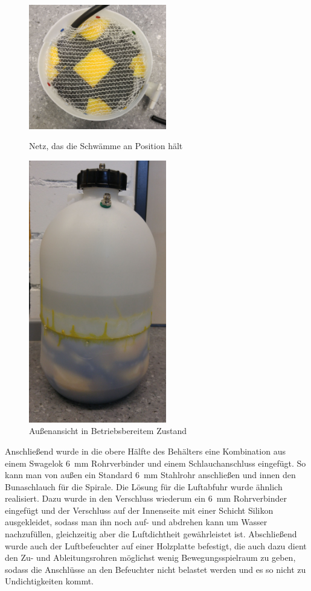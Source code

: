 \begin{figure}[h!]
	\begin{minipage}[hbt]{6cm}
		\centering
		\includegraphics[width=6cm]{Luftbefeuchter_Netz.jpg}
		\caption[Netz Luftbefeuchter]{Netz, das die Schwämme an Position hält}
	\end{minipage}
	\hfill
	\begin{minipage}[hbt]{6cm}
		\centering
		\includegraphics[width=6cm]{Luftbefeuchter_gesamt.jpg}
		\caption[Außenansicht Luftbefeuchter]{Außenansicht in Betriebsbereitem Zustand}
	\end{minipage}
\end{figure}

\vspace{1cm}

Anschließend wurde in die obere Hälfte des Behälters eine Kombination aus einem Swagelok \SI{6}{mm} Rohrverbinder und einem Schlauchanschluss eingefügt. So kann man von außen ein Standard \SI{6}{mm} Stahlrohr anschließen und innen den Bunaschlauch für die Spirale. Die Lösung für die Luftabfuhr wurde ähnlich realisiert. Dazu wurde in den Verschluss wiederum ein \SI{6}{mm} Rohrverbinder eingefügt und der Verschluss auf der Innenseite mit einer Schicht Silikon ausgekleidet, sodass man ihn noch auf- und abdrehen kann um Wasser nachzufüllen, gleichzeitig aber die Luftdichtheit gewährleistet ist. Abschließend wurde auch der Luftbefeuchter auf einer Holzplatte befestigt, die auch dazu dient den Zu- und Ableitungsrohren möglichst wenig Bewegungsspielraum zu geben, sodass die Anschlüsse an den Befeuchter nicht belastet werden und es so nicht zu Undichtigkeiten kommt.

